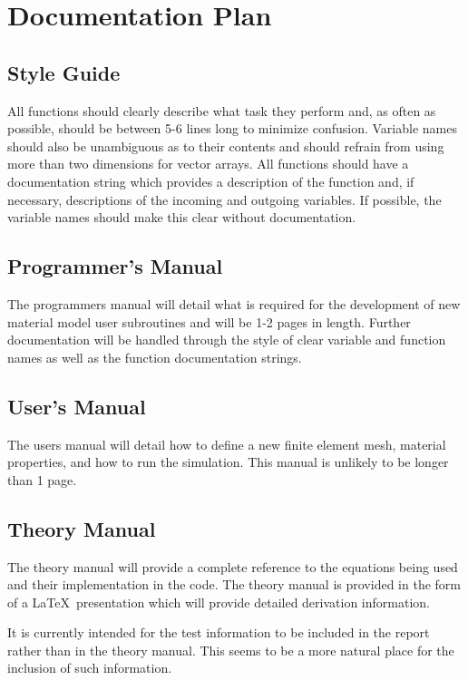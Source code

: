 \section{Documentation Plan}

\subsection{Style Guide}

All functions should clearly describe what task they perform and, as often as possible, should be between 5-6 lines long to minimize confusion. Variable names should also be unambiguous as to their contents and should refrain from using more than two dimensions for vector arrays. All functions should have a documentation string which provides a description of the function and, if necessary, descriptions of the incoming and outgoing variables. If possible, the variable names should make this clear without documentation.

\subsection{Programmer's Manual}

The programmers manual will detail what is required for the development of new material model user subroutines and will be 1-2 pages in length. Further documentation will be handled through the style of clear variable and function names as well as the function documentation strings.

\subsection{User's Manual}

The users manual will detail how to define a new finite element mesh, material properties, and how to run the simulation. This manual is unlikely to be longer than 1 page.

\subsection{Theory Manual}

The theory manual will provide a complete reference to the equations being used and their implementation in the code. The theory manual is provided in the form of a \LaTeX~presentation which will provide detailed derivation information.

It is currently intended for the test information to be included in the report rather than in the theory manual. This seems to be a more natural place for the inclusion of such information.

